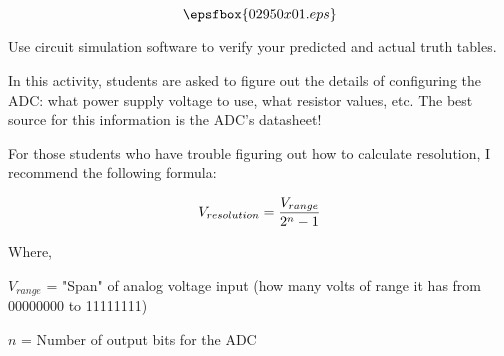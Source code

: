 

$$\epsfbox{02950x01.eps}$$

\vfil \eject






Use circuit simulation software to verify your predicted and actual truth tables.







In this activity, students are asked to figure out the details of configuring the ADC: what power supply voltage to use, what resistor values, etc.  The best source for this information is the ADC's datasheet!

For those students who have trouble figuring out how to calculate resolution, I recommend the following formula:

$$V_{resolution} = {V_{range} \over {2^n - 1}}$$

\noindent
Where,

$V_{range}$ = "Span" of analog voltage input (how many volts of range it has from 00000000 to 11111111)

$n$ = Number of output bits for the ADC




